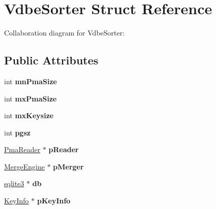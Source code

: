 \hypertarget{structVdbeSorter}{}\section{Vdbe\+Sorter Struct Reference}
\label{structVdbeSorter}


Collaboration diagram for Vdbe\+Sorter\+:
\subsection*{Public Attributes}
\begin{DoxyCompactItemize}
\item 
int {\bfseries mn\+Pma\+Size}\hypertarget{structVdbeSorter_a6d201d0f496260f7f2c7f450cae5898b}{}\label{structVdbeSorter_a6d201d0f496260f7f2c7f450cae5898b}

\item 
int {\bfseries mx\+Pma\+Size}\hypertarget{structVdbeSorter_ab23b8039f7b58052b6c6dfc32aa895ed}{}\label{structVdbeSorter_ab23b8039f7b58052b6c6dfc32aa895ed}

\item 
int {\bfseries mx\+Keysize}\hypertarget{structVdbeSorter_a378f212fc0dc1eb53662fe9651c83e92}{}\label{structVdbeSorter_a378f212fc0dc1eb53662fe9651c83e92}

\item 
int {\bfseries pgsz}\hypertarget{structVdbeSorter_adf515e49daec945d414c95c5793d8b92}{}\label{structVdbeSorter_adf515e49daec945d414c95c5793d8b92}

\item 
\hyperlink{structPmaReader}{Pma\+Reader} $\ast$ {\bfseries p\+Reader}\hypertarget{structVdbeSorter_ae5e5be145520adddd62d221dcdc1aa8e}{}\label{structVdbeSorter_ae5e5be145520adddd62d221dcdc1aa8e}

\item 
\hyperlink{structMergeEngine}{Merge\+Engine} $\ast$ {\bfseries p\+Merger}\hypertarget{structVdbeSorter_a8771886d3d97de93fd786b4ec9f2c185}{}\label{structVdbeSorter_a8771886d3d97de93fd786b4ec9f2c185}

\item 
\hyperlink{structsqlite3}{sqlite3} $\ast$ {\bfseries db}\hypertarget{structVdbeSorter_a8289109b89d3798362e4edc596c3c887}{}\label{structVdbeSorter_a8289109b89d3798362e4edc596c3c887}

\item 
\hyperlink{structKeyInfo}{Key\+Info} $\ast$ {\bfseries p\+Key\+Info}\hypertarget{structVdbeSorter_a97c1a2aefd6dd093e82eddbf1bc9ffde}{}\label{structVdbeSorter_a97c1a2aefd6dd093e82eddbf1bc9ffde}


\end{DoxyCompactItemize}
